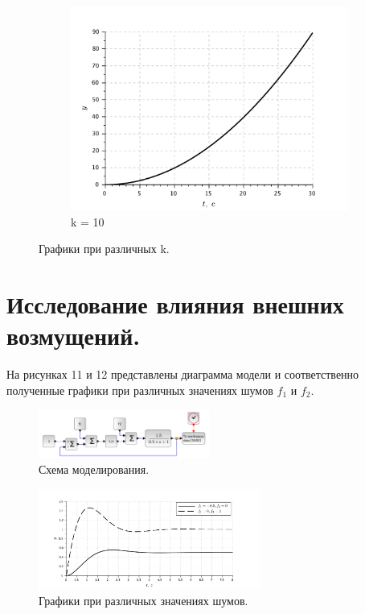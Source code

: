 \documentclass[a4paper, 11pt]{article}
\begin{document}
\begin{figure}[h!]
\begin{subfigure}{0.33\textwidth}
        \includegraphics[width = \textwidth]{images/graph2-3-K10.pdf}
        \caption{k = 10}
    \end{subfigure}
    \caption{Графики при различных k.}
\end{figure}

\newpage

\section*{Исследование влияния внешних возмущений.}
На рисунках 11 и 12 представлены диаграмма модели и соответственно полученные графики при различных значениях шумов $f_1$ и $f_2$.

\begin{figure}[h!]
    \centering
    \includegraphics[width = 0.5\textwidth]{images/model3.pdf}
    \caption{Схема моделирования.}
\end{figure}
\begin{figure}[h!]
    \centering
    \includegraphics[width = 0.65\textwidth]{images/graph3.pdf}
    \caption{Графики при различных значениях шумов.}
\end{figure}
\end{document}
